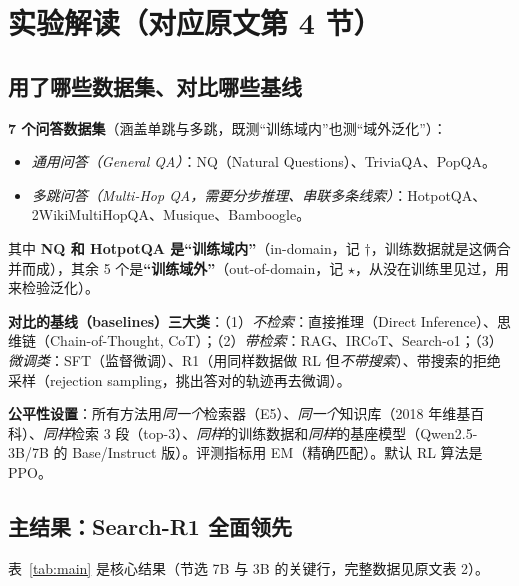 \documentclass[11pt,UTF8,fontset=fandol]{ctexart}
\begin{document}
\section{实验解读（对应原文第 4 节）}

\subsection{用了哪些数据集、对比哪些基线}

\textbf{7 个问答数据集}（涵盖单跳与多跳，既测“训练域内”也测“域外泛化”）：
\begin{itemize}[leftmargin=1.4em]
\item \emph{通用问答（General QA）}：NQ（Natural Questions）、TriviaQA、PopQA。
\item \emph{多跳问答（Multi-Hop QA，需要分步推理、串联多条线索）}：HotpotQA、2WikiMultiHopQA、Musique、Bamboogle。
\end{itemize}
其中 \textbf{NQ 和 HotpotQA 是“训练域内”}（in-domain，记 $\dagger$，训练数据就是这俩合并而成），其余 5 个是\textbf{“训练域外”}（out-of-domain，记 $\star$，从没在训练里见过，用来检验泛化）。

\textbf{对比的基线（baselines）三大类}：（1）\emph{不检索}：直接推理（Direct Inference）、思维链（Chain-of-Thought, CoT）；（2）\emph{带检索}：RAG、IRCoT、Search-o1；（3）\emph{微调类}：SFT（监督微调）、R1（用同样数据做 RL 但\emph{不带搜索}）、带搜索的拒绝采样（rejection sampling，挑出答对的轨迹再去微调）。

\textbf{公平性设置}：所有方法用\emph{同一个}检索器（E5）、\emph{同一个}知识库（2018 年维基百科）、\emph{同样}检索 3 段（top-3）、\emph{同样}的训练数据和\emph{同样}的基座模型（Qwen2.5-3B/7B 的 Base/Instruct 版）。评测指标用 EM（精确匹配）。默认 RL 算法是 PPO。

\subsection{主结果：Search-R1 全面领先}

表~\ref{tab:main} 是核心结果（节选 7B 与 3B 的关键行，完整数据见原文表 2）。
\end{document}
